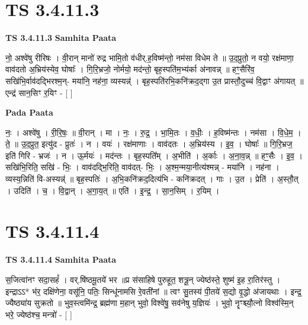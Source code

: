 \documentclass[17pt]{extarticle}
\begin{document}

\section{ TS 3.4.11.3 }

\textbf{TS 3.4.11.3 } \newline
\textbf{Samhita Paata} \newline

नो॒ अश्वे॑षु रीरिषः । वी॒रान् मानो॑ रुद्र भामि॒तो व॑धीर्.ह॒विष्म॑न्तो॒ नम॑सा विधेम ते ॥ उ॒द॒प्रुतो॒ न वयो॒ रक्ष॑माणा॒ वाव॑दतो अ॒भ्रिय॑स्येव॒ घोषाः᳚ । गि॒रि॒भ्रजो॒ नोर्मयो॒ मद॑न्तो॒ बृह॒स्पति॑म॒भ्य॑र्का अ॑नावन्न् ॥ हꣳ॒॒सैरि॑व॒ सखि॑भि॒र्वाव॑दद्भिरश्म॒न्- मया॑नि॒ नह॑ना॒ व्यस्यन्न्॑ । बृह॒स्पति॑रभि॒कनि॑क्रद॒द्गा उ॒त प्रास्तौ॒दुच्च॑ वि॒द्वाꣳ अ॑गायत् ॥एन्द्र॑ सान॒सिꣳ र॒यिꣳ - [  ] \newline

\textbf{Pada Paata} \newline

नः॒ । अश्वे॑षु । री॒रि॒षः॒ ॥ वी॒रान् । मा । नः॒ । रु॒द्र॒ । भा॒मि॒तः । व॒धीः॒ । ह॒विष्म॑न्तः । नम॑सा । वि॒धे॒म॒ । ते॒ ॥ उ॒द॒प्रुत॒ इत्यु॑द - प्रुतः॑ । न । वयः॑ । रक्ष॑माणाः । वाव॑दतः । अ॒भ्रिय॑स्य । इ॒व॒ । घोषाः᳚ ॥ गि॒रि॒भ्रज॒ इति॑ गिरि - भ्रजः॑ । न । ऊ॒र्मयः॑ । मद॑न्तः । बृह॒स्पति᳚म् । अ॒भीति॑ । अ॒र्काः । अ॒ना॒व॒न्न् ॥ हꣳ॒॒सैः । इ॒व॒ । सखि॑भि॒रिति॒ सखि॑ - भिः॒ । वाव॑दद्भि॒रिति॒ वाव॑दत्- भिः॒ । अ॒श्म॒न्मया॒नीत्य॑श्मन्न् - मया॑नि । नह॑ना । व्यस्य॒न्निति॑ वि-अस्यन्न्॑ ॥ बृह॒स्पतिः॑ । अ॒भि॒कनि॑क्रद॒दित्य॑भि - कनि॑क्रदत् । गाः । उ॒त । प्रेति॑ । अ॒स्तौ॒त् । उदिति॑ । च॒ । वि॒द्वान् । अ॒गा॒य॒त् ॥ एति॑ । इ॒न्द्र॒ । सा॒न॒सिम् । र॒यिम् ।  \newline





\section{ TS 3.4.11.4 }

\textbf{TS 3.4.11.4 } \newline
\textbf{Samhita Paata} \newline

स॒जित्वा॑नꣳ सदा॒सहं᳚ । वर्.षि॑ष्ठमू॒तये॑ भर ॥प्र स॑साहिषे पुरुहूत॒ शत्रू॒न् ज्येष्ठ॑स्ते॒ शुष्म॑ इ॒ह रा॒तिर॑स्तु । इन्द्राऽऽ* भ॑र॒ दक्षि॑णेना॒ वसू॑नि॒ पतिः॒ सिन्धू॑नामसि रे॒वती॑नां ॥ त्वꣳ सु॒तस्य॑ पी॒तये॑ स॒द्यो वृ॒द्धो अ॑जायथाः । इन्द्र॒ ज्यैष्ठ्या॑य सुक्रतो ॥ भुव॒स्त्वमि॑न्द्र॒ ब्रह्म॑णा म॒हान् भुवो॒ विश्वे॑षु॒ सव॑नेषु य॒ज्ञियः॑ । भुवो॒ नॄꣳश्च्यौ॒त्नो विश्व॑स्मि॒न् भरे॒ ज्येष्ठ॑श्च॒ मन्त्रो॑ - [  ] \newline
\end{document}

